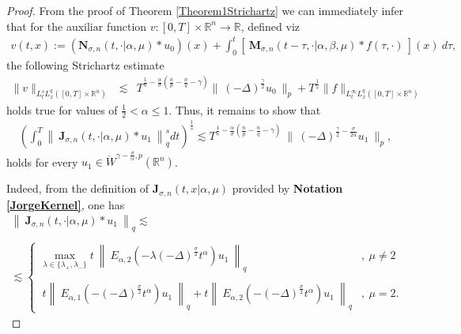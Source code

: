 \documentclass{amsart}
\theoremstyle{definition}
\theoremstyle{remark}
\numberwithin{equation}{section}
\newcommand{\BR}{{\mathbb R}}
\begin{document}
		\begin{proof}
			From the proof of Theorem \ref{Theorem1Strichartz} we can immediately infer that for the auxiliar function $v:[0,T]\times \BR^n\rightarrow\BR$, defined viz
			\begin{eqnarray*}
				v(t,x):=\left({\bm N}_{\sigma,n}(t,\cdot|\alpha,\mu)*u_0\right)(x)+\int_{0}^t \left[~{\bm M}_{\sigma,n}(t-\tau,\cdot|\alpha,\beta,\mu)\ast f(\tau,\cdot)~\right](x)~d\tau,
			\end{eqnarray*} the following Strichartz estimate
			\begin{eqnarray*}
				\displaystyle \|v\|_{L^s_tL^q_x([0,T]\times\BR^n)}
				&\lesssim& T^{\frac{1}{s}-\frac{\alpha}{\sigma}\left(\frac{n}{p}-\frac{n}{q}-\gamma\right)} \|~(-\Delta)^{\frac{\gamma}{2}}u_0~\|_{p}+T^{\frac{1}{s}}\|f\|_{L^\infty_tL^q_x([0,T]\times\BR^n)} 
			\end{eqnarray*} holds true for values of $\frac{1}{2}<\alpha\leq 1$. 
			Thus, it remains to show that 
			\begin{eqnarray}
				\label{StrichartzJorge}
				\left(\int_0^T\left\|~\displaystyle {\bm J}_{\sigma,n}(t,\cdot|\alpha,\mu)\ast u_1~\right \|_q^s dt\right)^{\frac{1}{s}}  \lesssim T^{\frac{1}{s}-\frac{\alpha}{\sigma}\left(\frac{n}{p}-\frac{n}{q}-\gamma\right)}~\|~(-\Delta)^{\frac{\gamma}{2}-\frac{\sigma}{2\alpha}} u_1~\|_{p},
			\end{eqnarray}
			holds for every $u_1\in \dot{W}^{\gamma-\frac{\sigma}{\alpha},p}(\BR^n)$.
			
			Indeed, from the definition of ${\bm J}_{\sigma,n}(t,x|\alpha,\mu)$ provided by {\bf Notation \ref{JorgeKernel}}, one has
			\begin{eqnarray*}
				\left\|~\displaystyle {\bm J}_{\sigma,n}(t,\cdot|\alpha,\mu)\ast u_1~\right \|_q \lesssim \\ \ \\
				\lesssim \begin{cases}
					\displaystyle 	 \max_{\lambda \in \{\lambda_+,\lambda_-\}} t~ \left\|~E_{\alpha,2}\left(-\lambda(-\Delta)^{\frac{\sigma}{2}} t^\alpha\right)u_1~\right\|_q  &,~\mu\neq 2 \\ \ \\
					\displaystyle ~t\left\|~E_{\alpha,1}\left(-(-\Delta)^{\frac{\sigma}{2}}t^\alpha\right) u_1~\right\|_q+t \left\|~E_{\alpha,2}\left(-(-\Delta)^{\frac{\sigma}{2}}t^\alpha\right) u_1~\right\|_q &,~\mu= 2.
				\end{cases}
			\end{eqnarray*}	
			

\end{proof}
\end{document}
